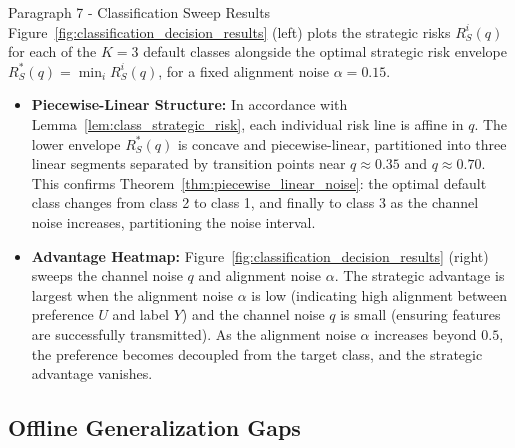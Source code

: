 \begin{sourceblock}{Paragraph 7 - Classification Sweep Results}
Figure~\ref{fig:classification_decision_results} (left) plots the strategic risks $R^i_S(q)$ for each of the $K=3$ default classes alongside the optimal strategic risk envelope $R^*_S(q) = \min_i R^i_S(q)$, for a fixed alignment noise $\alpha = 0.15$.
\begin{itemize}
    \item \textbf{Piecewise-Linear Structure:} In accordance with Lemma~\ref{lem:class_strategic_risk}, each individual risk line is affine in $q$. The lower envelope $R^*_S(q)$ is concave and piecewise-linear, partitioned into three linear segments separated by transition points near $q \approx 0.35$ and $q \approx 0.70$. This confirms Theorem~\ref{thm:piecewise_linear_noise}: the optimal default class changes from class 2 to class 1, and finally to class 3 as the channel noise increases, partitioning the noise interval.
    \item \textbf{Advantage Heatmap:} Figure~\ref{fig:classification_decision_results} (right) sweeps the channel noise $q$ and alignment noise $\alpha$. The strategic advantage is largest when the alignment noise $\alpha$ is low (indicating high alignment between preference $U$ and label $Y$) and the channel noise $q$ is small (ensuring features are successfully transmitted). As the alignment noise $\alpha$ increases beyond $0.5$, the preference becomes decoupled from the target class, and the strategic advantage vanishes.
\end{itemize}
\end{sourceblock}

\begin{faqblock}
\faqanswers
{}
\end{faqblock}

\subsection{Offline Generalization Gaps}
\label{sec:exp_offline}

